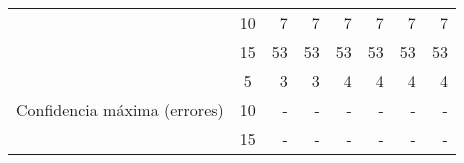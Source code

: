 \begin{sidewaystable}
\begin{tabular}{@{}ccc|rrrrrr@{}}
\multicolumn{2}{c}{}                                               & 10       & 7                            & 7                            & 7                             & 7                             & 7                             & 7                             \\
\multicolumn{2}{c}{}                                               & 15       & 53                           & 53                           & 53                            & 53                            & 53                            & 53                            \\
\midrule
\multicolumn{2}{c}{\multirow{3}{*}{Confidencia máxima (errores)}}  & 5        & 3                            & 3                            & 4                             & 4                             & 4                             & 4                             \\
\multicolumn{2}{c}{}                                               & 10       & -                            & -                            & -                             & -                             & -                             & -                             \\
\multicolumn{2}{c}{}                                               & 15       & -                            & -                            & -                             & -                             & -                             & -                            
                         
\\ \midrule \bottomrule 


\end{tabular}
\end{sidewaystable}



